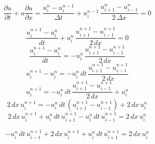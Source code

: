 \begin{equation}
\frac {\partial u}{\partial t}+u{\frac {\partial u}{\partial x}} = \frac{u_{i}^{n}-u_{i}^{n-1}}{\Delta t}+ u_{i}^{n-1}\, \frac{u_{i+1}^{n}-u_{i-1}^{n}}{2\,\Delta x}=0
\end{equation}


\begin{equation}
    \frac{u_{i}^{n+1}-u_{i}^{n}}{dt} + u_{i}^{n} \, \frac{u_{i+1}^{n+1} - u_{i-1}^{n+1}}{2 \, dx} = 0
\end{equation}
\begin{equation}
  \frac{u_{i}^{n+1}-u_{i}^{n}}{dt} = -u_{i}^{n} \, \frac{u_{i+1}^{n+1} - u_{i-1}^{n+1}}{2 \, dx}
\end{equation}
\begin{equation}
  u_{i}^{n+1}-u_{i}^{n} = -u_{i}^{n} \, dt \, \frac{u_{i+1}^{n+1} - u_{i-1}^{n+1}}{2 \, dx}
\end{equation}
\begin{equation}
  u_{i}^{n+1} = -u_{i}^{n} \, dt \, \frac{u_{i+1}^{n+1} - u_{i-1}^{n+1}}{2 \, dx} + u_{i}^{n}
\end{equation}
\begin{equation}
2 \, dx \,  u_{i}^{n+1} = -u_{i}^{n} \, dt \, \left(u_{i+1}^{n+1} - u_{i-1}^{n+1} \right) + 2 \, dx \, u_{i}^{n}
\end{equation}
\begin{equation}
  2 \, dx \,  u_{i}^{n+1} + u_{i}^{n} \, dt \, u_{i+1}^{n+1} -u_{i}^{n} \, dt \, u_{i-1}^{n+1} =  2 \, dx \, u_{i}^{n}
\end{equation}


\begin{equation}
 -u_{i}^{n} \, dt \, u_{i-1}^{n+1} +  2 \, dx \,  u_{i}^{n+1} + u_{i}^{n} \, dt \, u_{i+1}^{n+1}=  2 \, dx \, u_{i}^{n}
\end{equation}



